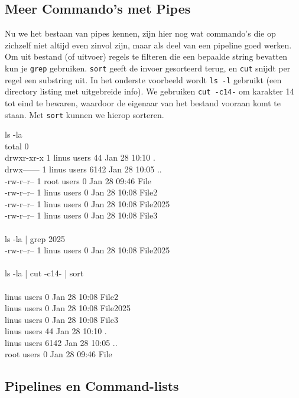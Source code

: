 \subsection{Meer Commando's met Pipes}\label{meer-commandos-met-pipes}

Nu we het bestaan van pipes kennen, zijn hier nog wat commando's die op zichzelf niet altijd even zinvol zijn, maar als deel van een pipeline goed werken. Om uit bestand (of uitvoer) regels te filteren die een bepaalde string bevatten kun je \texttt{grep} gebruiken. \texttt{sort} geeft de invoer gesorteerd terug, en \texttt{cut} snijdt per regel een substring uit. In het onderste voorbeeld wordt \texttt{ls\ -l} gebruikt (een directory listing met uitgebreide info). We gebruiken \texttt{cut\ -c14-} om karakter 14 tot eind te bewaren, waardoor de eigenaar van het bestand vooraan komt te staan. Met \texttt{sort} kunnen we hierop sorteren.

\begin{bash}
\p[~/Folder] ls -la\\
total 0\\
drwxr-xr-x 1 linus users   44 Jan 28 10:10 .\\
drwx------ 1 linus users 6142 Jan 28 10:05 ..\\
-rw-r--r-- 1 root  users    0 Jan 28 09:46 File\\
-rw-r--r-- 1 linus users    0 Jan 28 10:08 File2\\
-rw-r--r-- 1 linus users    0 Jan 28 10:08 File2025\\
-rw-r--r-- 1 linus users    0 Jan 28 10:08 File3\\
\\
\p[~/Folder] ls -la | grep 2025\\
-rw-r--r-- 1 linus users 0 Jan 28 10:08 File2025\\
\\
\p[~/Folder] ls -la | cut -c14- | sort\\
\\
linus users    0 Jan 28 10:08 File2\\
linus users    0 Jan 28 10:08 File2025\\
linus users    0 Jan 28 10:08 File3\\
linus users   44 Jan 28 10:10 .\\
linus users 6142 Jan 28 10:05 ..\\
root  users    0 Jan 28 09:46 File\\
\end{bash}

\subsection{Pipelines en Command-lists}\label{pipelines-en-command-lists}

